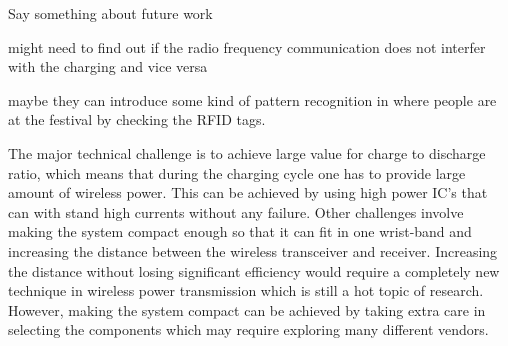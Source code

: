

Say something about future work

might need to find out if the radio frequency communication does not interfer with the charging and vice versa

maybe they can introduce some kind of pattern recognition in where people are at the festival by checking the RFID tags. 


The major technical challenge is to achieve large value for charge to discharge ratio, which means that during the charging cycle one has to provide large amount of wireless power. This can be achieved by using high power IC's that can with stand high currents without any failure. 
Other challenges involve making the system compact enough so that it can fit in one wrist-band and increasing the distance between the wireless transceiver and receiver. Increasing the distance without losing significant efficiency would require a completely new technique in wireless power transmission which is still a hot topic of research. However, making the system compact can be achieved by taking extra care in selecting the components which may require exploring many different vendors.